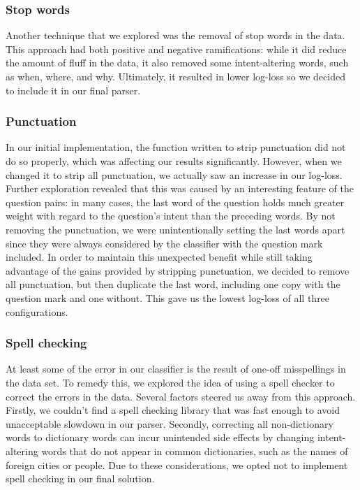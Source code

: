 \documentclass{article}
\begin{document}
\subsubsection{Stop words}

Another technique that we explored was the removal of stop words in the data.
This approach had both positive and negative ramifications: while it did reduce
the amount of fluff in the data, it also removed some intent-altering words,
such as when, where, and why. Ultimately, it resulted in lower log-loss so we
decided to include it in our final parser.

\subsubsection{Punctuation}

In our initial implementation, the function written to strip punctuation did not
do so properly, which was affecting our results significantly. However, when we
changed it to strip all punctuation, we actually saw an increase in our
log-loss. Further exploration revealed that this was caused by an interesting
feature of the question pairs: in many cases, the last word of the question
holds much greater weight with regard to the question's intent than the
preceding words. By not removing the punctuation, we were unintentionally
setting the last words apart since they were always considered by the classifier
with the question mark included. In order to maintain this unexpected benefit
while still taking advantage of the gains provided by stripping punctuation, we
decided to remove all punctuation, but then duplicate the last word, including
one copy with the question mark and one without. This gave us the lowest
log-loss of all three configurations.

\subsubsection{Spell checking}

At least some of the error in our classifier is the result of one-off
misspellings in the data set. To remedy this, we explored the idea of using a
spell checker to correct the errors in the data. Several factors steered us away
from this approach. Firstly, we couldn't find a spell checking library that was
fast enough to avoid unacceptable slowdown in our parser. Secondly, correcting
all non-dictionary words to dictionary words can incur unintended side effects
by changing intent-altering words that do not appear in common dictionaries,
such as the names of foreign cities or people. Due to these considerations, we
opted not to implement spell checking in our final solution.
\end{document}
